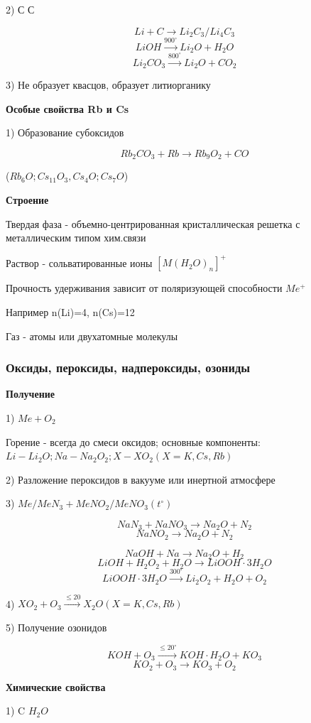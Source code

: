 \documentclass[14pt,a4paper]{scrartcl}
\begin{document}
2) С $С$

$$Li + C \rightarrow Li_2C_3 / Li_4C_3$$
$$LiOH \xrightarrow{900^{\circ}} Li_2O + H_2O$$
$$Li_2CO_3 \xrightarrow{800^{\circ}} Li_2O + CO_2$$

3) Не образует квасцов, образует литиорганику

\textbf{Особые свойства Rb и Cs }

1) Образование субоксидов

$$Rb_2CO_3 + Rb \rightarrow Rb_9O_2 + CO$$

($Rb_6O; Cs_{11}O_3, Cs_4O; Cs_7O$)

\textbf{Строение}

Твердая фаза - объемно-центрированная кристаллическая решетка с металлическим типом хим.связи

Раствор - сольватированные ионы $[M(H_2O)_n]^+$

Прочность удерживания зависит от поляризующей способности $Me^+$

Например n(Li)=4, n(Cs)=12

Газ - атомы или двухатомные молекулы

\subsubsection{Оксиды, пероксиды, надпероксиды, озониды}

\textbf{Получение}

1) $Me+ O_2$

Горение - всегда до смеси оксидов; основные компоненты:\\
$Li - Li_2O; Na - Na_2O_2; X-XO_2(X= K, Cs, Rb)$

2) Разложение пероксидов в вакууме или инертной атмосфере

3) $Me/MeN_3 + MeNO_2/MeNO_3 (t^{\circ})$

$$NaN_3 + NaNO_3 \rightarrow Na_2O + N_2$$
$$NaNO_2 \rightarrow Na_2O + N_2$$

$$NaOH + Na \rightarrow Na_2O + H_2$$
$$LiOH + H_2O_2 + H_2O \rightarrow LiOOH\cdot 3H_2O$$
$$LiOOH\cdot 3H_2O \xrightarrow{300^{\circ}} Li_2O_2 + H_2O + O_2$$

4) $XO_2 + O_3 \xrightarrow{\leq 20} X_2O (X= K, Cs, Rb)$

5) Получение озонидов

$$KOH + O_3 \xrightarrow{\leq 20^{\circ}} KOH\cdot H_2O + KO_3$$
$$KO_2 + O_3 \rightarrow KO_3 + O_2$$

\textbf{Химические свойства}

1) C $H_2O$
\end{document}
